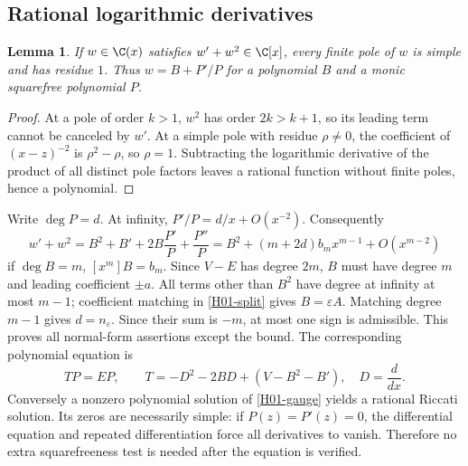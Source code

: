\documentclass[11pt,a4paper]{article}
\newtheorem{lemma}[theorem]{Lemma}
\theoremstyle{definition}\newtheorem{definition}[theorem]{Definition}
\theoremstyle{remark}\newtheorem{remark}[theorem]{Remark}
\newcommand{\dd}{\frac{d}{dx}}\newcommand{\Span}{\operatorname{span}}\newcommand{\Res}{\operatorname{Res}}
\numberwithin{equation}{section}
\begin{document}
\subsection{Rational logarithmic derivatives}\label{H01-sec-2}
\begin{lemma}\label{H01-normal}
If $w\in\C(x)$ satisfies $w'+w^2\in\C[x]$, every finite pole of $w$ is simple and has residue $1$. Thus $w=B+P'/P$ for a polynomial $B$ and a monic squarefree polynomial $P$.
\end{lemma}
\begin{proof}
At a pole of order $k>1$, $w^2$ has order $2k>k+1$, so its leading term cannot be canceled by $w'$. At a simple pole with residue $\rho\ne0$, the coefficient of $(x-z)^{-2}$ is $\rho^2-\rho$, so $\rho=1$. Subtracting the logarithmic derivative of the product of all distinct pole factors leaves a rational function without finite poles, hence a polynomial.
\end{proof}
Write $\deg P=d$. At infinity, $P'/P=d/x+O(x^{-2})$. Consequently
\[ w'+w^2=B^2+B'+2B\frac{P'}P+\frac{P''}P
 =B^2+(m+2d)b_mx^{m-1}+O(x^{m-2})\]
if $\deg B=m$, $[x^m]B=b_m$. Since $V-E$ has degree $2m$, $B$ must have degree $m$ and leading coefficient $\pm a$. All terms other than $B^2$ have degree at infinity at most $m-1$; coefficient matching in \eqref{H01-split} gives $B=\varepsilon A$. Matching degree $m-1$ gives $d=n_\varepsilon$. Since their sum is $-m$, at most one sign is admissible. This proves all normal-form assertions except the bound. The corresponding polynomial equation is
\begin{equation}\label{H01-gauge}
TP=EP,\qquad T=-D^2-2BD+(V-B^2-B'),\quad D=\dd.
\end{equation}
Conversely a nonzero polynomial solution of \eqref{H01-gauge} yields a rational Riccati solution. Its zeros are necessarily simple: if $P(z)=P'(z)=0$, the differential equation and repeated differentiation force all derivatives to vanish. Therefore no extra squarefreeness test is needed after the equation is verified.
\end{document}
